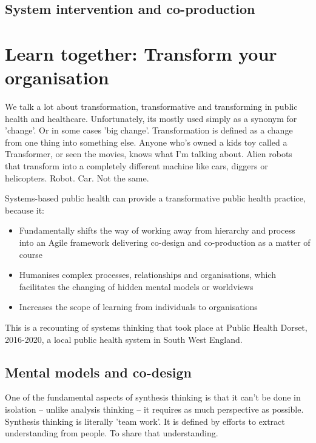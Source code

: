 \subsection*{System intervention and co-production}




\section*{Learn together: Transform your organisation}

We talk a lot about transformation, transformative and transforming in public health and healthcare. Unfortunately, its mostly used simply as a synonym for 'change'. Or in some cases 'big change'. Transformation is defined as a change from one thing into something else. Anyone who's owned a kids toy called a Transformer, or seen the movies, knows what I'm talking about. Alien robots that transform into a completely different machine like cars, diggers or helicopters. Robot. Car. Not the same.

Systems-based public health can provide a transformative public health practice, because it:
\begin{itemize}
	\item Fundamentally shifts the way of working away from hierarchy and process into an Agile framework delivering co-design and co-production as a matter of course
	\item Humanises complex processes, relationships and organisations, which facilitates the changing of hidden mental models or worldviews
	\item Increases the scope of learning from individuals to organisations
\end{itemize}










This is a recounting of systems thinking that took place at Public Health Dorset, 2016-2020, a local public health system in South West England.

\subsection*{Mental models and co-design}
One of the fundamental aspects of synthesis thinking is that it can't be done in isolation -- unlike analysis thinking -- it requires as much perspective as possible. Synthesis thinking is literally 'team work'. It is defined by efforts to extract understanding from people. To share that understanding.

